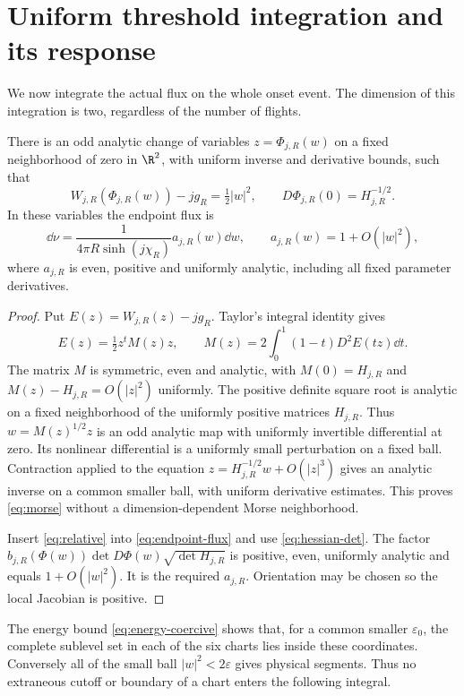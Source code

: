 \section{Uniform threshold integration and its response}
\label{sec:threshold-proof}
We now integrate the actual flux on the whole onset event. The dimension
of this integration is two, regardless of the number of flights.

\begin{lemma}\label{lem:morse}
There is an odd analytic change of variables $z=\Phi_{j,R}(w)$ on a
fixed neighborhood of zero in $\R^2$, with uniform inverse and derivative
bounds, such that
\begin{equation}\label{eq:morse}
 W_{j,R}(\Phi_{j,R}(w))-jg_R=\tfrac12|w|^2,
 \qquad D\Phi_{j,R}(0)=H_{j,R}^{-1/2}.
\end{equation}
In these variables the endpoint flux is
\begin{equation}\label{eq:morse-flux}
 \dd\nu=\frac{1}{4\pi R\sinh(j\chi_R)}
           a_{j,R}(w)\dd w,
 \qquad a_{j,R}(w)=1+O(|w|^2),
\end{equation}
where $a_{j,R}$ is even, positive and uniformly analytic, including
all fixed parameter derivatives.
\end{lemma}
\begin{proof}
Put $E(z)=W_{j,R}(z)-jg_R$. Taylor's integral identity gives
\[
 E(z)=\tfrac12 z^t M(z)z,\qquad
 M(z)=2\int_0^1(1-t)D^2E(tz)\dd t.
\]
The matrix $M$ is symmetric, even and analytic, with $M(0)=H_{j,R}$
and $M(z)-H_{j,R}=O(|z|^2)$ uniformly. The positive definite square
root is analytic on a fixed neighborhood of the uniformly positive
matrices $H_{j,R}$. Thus $w=M(z)^{1/2}z$ is an odd analytic map with
uniformly invertible differential at zero. Its nonlinear differential
is a uniformly small perturbation on a fixed ball. Contraction applied
to the equation $z=H_{j,R}^{-1/2}w+O(|z|^3)$ gives an analytic inverse
on a common smaller ball, with uniform derivative estimates. This proves
\eqref{eq:morse} without a dimension-dependent Morse neighborhood.

Insert \eqref{eq:relative} into \eqref{eq:endpoint-flux} and use
\eqref{eq:hessian-det}. The factor
$b_{j,R}(\Phi(w))\det D\Phi(w)\sqrt{\det H_{j,R}}$ is positive,
even, uniformly analytic and equals $1+O(|w|^2)$. It is the required
$a_{j,R}$. Orientation may be chosen so the local Jacobian is positive.
\end{proof}

The energy bound \eqref{eq:energy-coercive} shows that, for a common
smaller $\varepsilon_0$, the complete sublevel set in each of the six
charts lies inside these coordinates. Conversely all of the small
ball $|w|^2<2\varepsilon$ gives physical segments. Thus no extraneous
cutoff or boundary of a chart enters the following integral.

